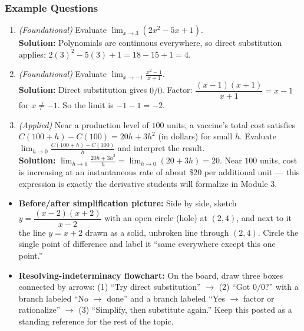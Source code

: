 \documentclass[11pt]{article}
\begin{document}
\subsubsection*{Example Questions}
\begin{enumerate}[leftmargin=*]
  \item \textit{(Foundational)} Evaluate $\displaystyle\lim_{x\to 3}(2x^2-5x+1)$. \\
  \textbf{Solution:} Polynomials are continuous everywhere, so direct substitution applies: $2(3)^2-5(3)+1 = 18-15+1=4$.

  \item \textit{(Foundational)} Evaluate $\displaystyle\lim_{x\to -1}\frac{x^2-1}{x+1}$. \\
  \textbf{Solution:} Direct substitution gives $0/0$. Factor: $\dfrac{(x-1)(x+1)}{x+1}=x-1$ for $x\ne -1$. So the limit is $-1-1=-2$.

  \item \textit{(Applied)} Near a production level of $100$ units, a vaccine's total cost satisfies $C(100+h)-C(100)=20h+3h^2$ (in dollars) for small $h$. Evaluate $\displaystyle\lim_{h\to 0}\frac{C(100+h)-C(100)}{h}$ and interpret the result. \\
  \textbf{Solution:} $\displaystyle\lim_{h\to 0}\frac{20h+3h^2}{h}=\lim_{h\to 0}(20+3h)=20$. Near $100$ units, cost is increasing at an instantaneous rate of about \$20 per additional unit --- this expression is exactly the derivative students will formalize in Module 3.
\end{enumerate}

\begin{instructorbox}
\begin{itemize}[leftmargin=*]
  \item \textbf{Before/after simplification picture:} Side by side, sketch $y=\dfrac{(x-2)(x+2)}{x-2}$ with an open circle (hole) at $(2,4)$, and next to it the line $y=x+2$ drawn as a solid, unbroken line through $(2,4)$. Circle the single point of difference and label it ``same everywhere except this one point.''
  \item \textbf{Resolving-indeterminacy flowchart:} On the board, draw three boxes connected by arrows: (1) ``Try direct substitution'' $\to$ (2) ``Got $0/0$?'' with a branch labeled ``No $\to$ done'' and a branch labeled ``Yes $\to$ factor or rationalize'' $\to$ (3) ``Simplify, then substitute again.'' Keep this posted as a standing reference for the rest of the topic.
\end{itemize}
\end{instructorbox}
\end{document}
